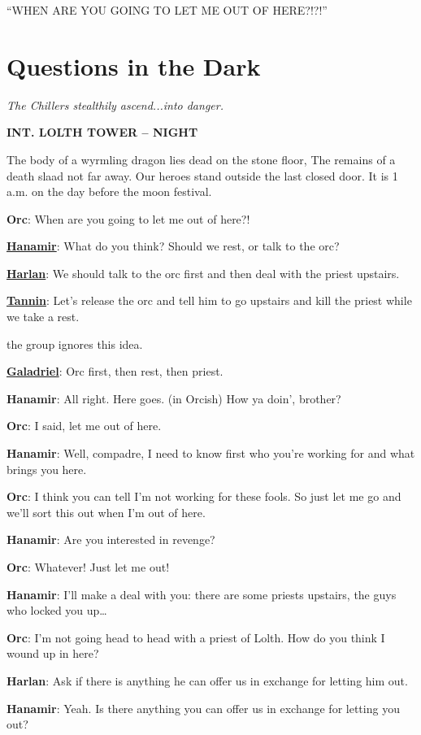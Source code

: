 \documentclass[smalldemyvopaper,11pt,twoside,onecolumn,openright,extrafontsizes]{memoir}
\newcommand{\chapdesc}[1]{
    \begin{flushright}
    \emph{{#1}}
    \end{flushright}
    \vspace{26pt}
}
\begin{document}
``WHEN ARE YOU GOING TO LET ME OUT OF HERE?!?!''


\chapter{Questions in the Dark}
\chapdesc{The Chillers stealthily ascend...into danger.}

\textbf{INT. LOLTH TOWER -- NIGHT}

The body of a wyrmling dragon lies dead on the stone floor, The remains
of a death slaad not far away. Our heroes stand outside the last closed
door. It is 1 a.m. on the day before the moon festival.

\textbf{Orc}: When are you going to let me out of here?!

\textbf{\href{/characters/hanamir/}{Hanamir}}: What do you think? Should
we rest, or talk to the orc?

\textbf{\href{/characters/harlan/}{Harlan}}: We should talk to the orc
first and then deal with the priest upstairs.

\textbf{\href{/characters/tannin/}{Tannin}}: Let's release the orc and
tell him to go upstairs and kill the priest while we take a rest.

the group ignores this idea.

\textbf{\href{/characters/galadriel/}{Galadriel}}: Orc first, then rest,
then priest.

\textbf{Hanamir}: All right. Here goes. (in Orcish) How ya doin',
brother?

\textbf{Orc}: I said, let me out of here.

\textbf{Hanamir}: Well, compadre, I need to know first who you're
working for and what brings you here.

\textbf{Orc}: I think you can tell I'm not working for these fools. So
just let me go and we'll sort this out when I'm out of here.

\textbf{Hanamir}: Are you interested in revenge?

\textbf{Orc}: Whatever! Just let me out!

\textbf{Hanamir}: I'll make a deal with you: there are some priests
upstairs, the guys who locked you up\ldots{}

\textbf{Orc}: I'm not going head to head with a priest of Lolth. How do
you think I wound up in here?

\textbf{Harlan}: Ask if there is anything he can offer us in exchange
for letting him out.

\textbf{Hanamir}: Yeah. Is there anything you can offer us in exchange
for letting you out?
\end{document}
